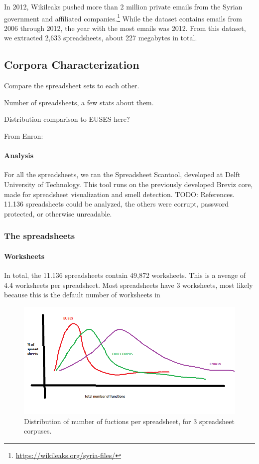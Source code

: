 \documentclass[conference]{IEEEtran}
\begin{document}
In 2012, Wikileaks pushed more than 2 million private emails from
the Syrian government and affiliated companies.\footnote{\url{https://wikileaks.org/syria-files/}}
While the dataset contains emails from 2006 through 2012, 
the year with the most emails was 2012.
From this dataset, we extracted 2,633 spreadsheets, about 227 megabytes in total.

\subsection{Corpora Characterization}

Compare the spreadsheet sets to each other.

Number of spreadsheets, a few stats about them.

Distribution comparison to EUSES here?

From Enron:

\paragraph{Analysis}
For all the spreadsheets, we ran the Spreadsheet Scantool, developed at Delft
University of Technology. This tool runs on the previously developed Breviz
core, made for spreadsheet visualization and smell detection. TODO: References.
11.136 spreadsheets could be analyzed, the others were corrupt, password
protected, or otherwise unreadable.

\subsubsection{The spreadsheets}
\paragraph{Worksheets}
In total, the 11.136 spreadsheets contain 49,872 worksheets. This is a aveage of
4.4 worksheets per spreadsheet. Most spreadsheets have 3 worksheets, most likely
because this is the default number of worksheets in


\begin{figure}[!t]
\centering
\includegraphics[width=\columnwidth]{functions.png}
\caption{Distribution of number of fuctions per spreadsheet, for 3 spreadsheet corpuses.}
\label{fig:functions}
\end{figure}
\end{document}
